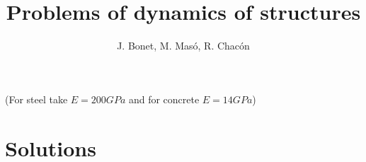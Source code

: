 \documentclass{problems}
\title{Problems of dynamics of structures}
\author{J. Bonet, M. Masó, R. Chacón}
\begin{document}
\maketitle

(For steel take $E=200GPa$ and for concrete $E=14GPa$)





\newpage
\section{Solutions}





\printbibliography
\end{document}
